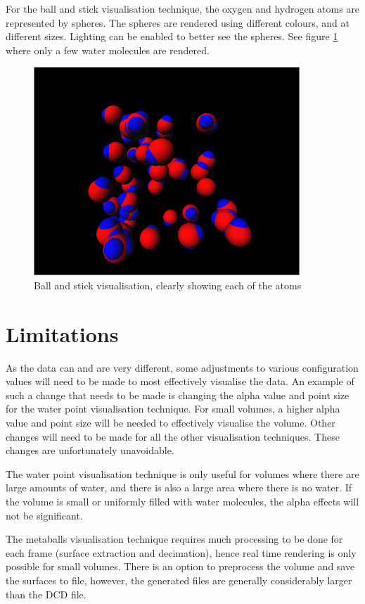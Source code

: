For the ball and stick visualisation technique, the oxygen and hydrogen atoms
are represented by spheres. The spheres are rendered using different colours,
and at different sizes. Lighting can be enabled to better see the spheres. See
figure \ref{fig:implementation_ballstick} where only a few water molecules are
rendered.

\begin{figure}[h!]
  \begin{center}
    \includegraphics[width=100mm]{ballstick}
  \end{center}
  \caption{Ball and stick visualisation, clearly showing each of the atoms}
  \label{fig:implementation_ballstick}
\end{figure}



\section{Limitations}
\label{sec:implementation_limitations}

As the data can and are very different, some adjustments to various
configuration values will need to be made to most effectively visualise the
data. An example of such a change that needs to be made is changing the alpha
value and point size for the water point visualisation technique. For small
volumes, a higher alpha value and point size will be needed to effectively
visualise the volume. Other changes will need to be made for all the other
visualisation techniques. These changes are unfortunately unavoidable.

The water point visualisation technique is only useful for volumes where there
are large amounts of water, and there is also a large area where there is no
water. If the volume is small or uniformly filled with water molecules, the
alpha effects will not be significant.

The metaballs visualisation technique requires much processing to be done for
each frame (surface extraction and decimation), hence real time rendering is
only possible for small volumes. There is an option to preprocess the volume
and save the surfaces to file, however, the generated files are generally
considerably larger than the DCD file.



